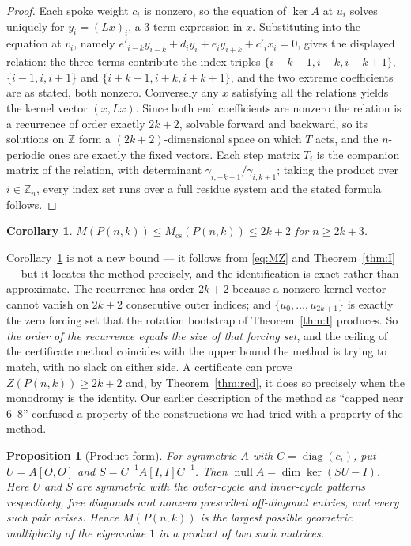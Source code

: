 \documentclass[11pt]{article}
\newtheorem{corollary}[theorem]{Corollary}
\newtheorem{proposition}[theorem]{Proposition}
\theoremstyle{definition}
\begin{document}
\begin{proof}
Each spoke weight $c_i$ is nonzero, so the equation of $\ker A$ at $u_i$
solves uniquely for $y_i=(Lx)_i$, a $3$-term expression in $x$. Substituting
into the equation at $v_i$, namely
$e'_{i-k}y_{i-k}+d_iy_i+e_iy_{i+k}+c'_ix_i=0$, gives the displayed relation:
the three terms contribute the index triples
$\{i-k-1,i-k,i-k+1\}$, $\{i-1,i,i+1\}$ and $\{i+k-1,i+k,i+k+1\}$, and the two
extreme coefficients are as stated, both nonzero. Conversely any $x$
satisfying all the relations yields the kernel vector $(x,Lx)$. Since both
end coefficients are nonzero the relation is a recurrence of order exactly
$2k+2$, solvable forward and backward, so its solutions on $\mathbb Z$ form a
$(2k+2)$-dimensional space on which $T$ acts, and the $n$-periodic ones are
exactly the fixed vectors. Each step matrix $T_i$ is the companion matrix of
the relation, with determinant $\gamma_{i,-k-1}/\gamma_{i,k+1}$; taking the
product over $i\in\mathbb Z_n$, every index set runs over a full residue
system and the stated formula follows.
\end{proof}

\begin{corollary}\label{cor:ceiling}
$M(P(n,k))\le M_{\mathrm{cs}}(P(n,k))\le 2k+2$ for $n\ge2k+3$.
\end{corollary}

\noindent
Corollary~\ref{cor:ceiling} is not a new bound --- it follows from
\eqref{eq:MZ} and Theorem~\ref{thm:I} --- but it locates the method precisely,
and the identification is exact rather than approximate. The recurrence has
order $2k+2$ because a nonzero kernel vector cannot vanish on $2k+2$
consecutive outer indices; and $\{u_0,\dots,u_{2k+1}\}$ is exactly the zero
forcing set that the rotation bootstrap of Theorem~\ref{thm:I} produces. So
\emph{the order of the recurrence equals the size of that forcing set}, and
the ceiling of the certificate method coincides with the upper bound the
method is trying to match, with no slack on either side. A certificate can
prove $Z(P(n,k))\ge 2k+2$ and, by Theorem~\ref{thm:red}, it does so precisely
when the monodromy is the identity. Our earlier description of the method as
``capped near $6$--$8$'' confused a property of the constructions we had tried
with a property of the method.

\begin{proposition}[Product form]\label{prop:SU}
For symmetric $A$ with $C=\operatorname{diag}(c_i)$, put $U=A[O,O]$ and
$S=C^{-1}A[I,I]C^{-1}$. Then $\operatorname{null}A=\dim\ker(SU-I)$. Here $U$
and $S$ are symmetric with the outer-cycle and inner-cycle patterns
respectively, free diagonals and nonzero prescribed off-diagonal entries, and
every such pair arises. Hence $M(P(n,k))$ is the largest possible geometric
multiplicity of the eigenvalue $1$ in a product of two such matrices.
\end{proposition}
\end{document}
